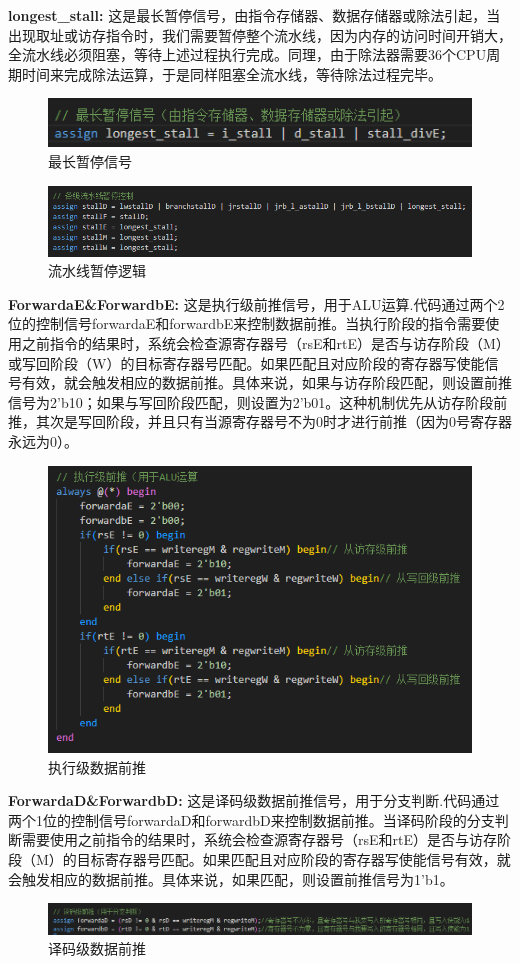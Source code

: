 \textbf{longest\_stall:}
这是最长暂停信号，由指令存储器、数据存储器或除法引起，当出现取址或访存指令时，我们需要暂停整个流水线，因为内存的访问时间开销大，全流水线必须阻塞，等待上述过程执行完成。同理，由于除法器需要36个CPU周期时间来完成除法运算，于是同样阻塞全流水线，等待除法过程完毕。
\begin{figure}[h]
\centering
\includegraphics[width=1\linewidth]{image/hazard1.png}
\caption{最长暂停信号}
\label{fig:enter-label}
\end{figure}

\begin{figure}[h]
\centering
\includegraphics[width=1\linewidth]{image/hazard2.png}
\caption{流水线暂停逻辑}
\label{fig:enter-label}
\end{figure}

\textbf{ForwardaE\&ForwardbE:}
这是执行级前推信号，用于ALU运算.代码通过两个2位的控制信号forwardaE和forwardbE来控制数据前推。当执行阶段的指令需要使用之前指令的结果时，系统会检查源寄存器号（rsE和rtE）是否与访存阶段（M）或写回阶段（W）的目标寄存器号匹配。如果匹配且对应阶段的寄存器写使能信号有效，就会触发相应的数据前推。具体来说，如果与访存阶段匹配，则设置前推信号为2'b10；如果与写回阶段匹配，则设置为2'b01。这种机制优先从访存阶段前推，其次是写回阶段，并且只有当源寄存器号不为0时才进行前推（因为0号寄存器永远为0）。
\begin{figure}[h]
\centering
\includegraphics[width=0.5\linewidth]{image/hazard3.png}
\caption{执行级数据前推}
\label{fig:enter-label}
\end{figure}

\textbf{ForwardaD\&ForwardbD:}
这是译码级数据前推信号，用于分支判断.代码通过两个1位的控制信号forwardaD和forwardbD来控制数据前推。当译码阶段的分支判断需要使用之前指令的结果时，系统会检查源寄存器号（rsE和rtE）是否与访存阶段（M）的目标寄存器号匹配。如果匹配且对应阶段的寄存器写使能信号有效，就会触发相应的数据前推。具体来说，如果匹配，则设置前推信号为1'b1。
\begin{figure}[h]
\centering
\includegraphics[width=1\linewidth]{image/hazard9.png}
\caption{译码级数据前推}
\label{fig:enter-label}
\end{figure}

